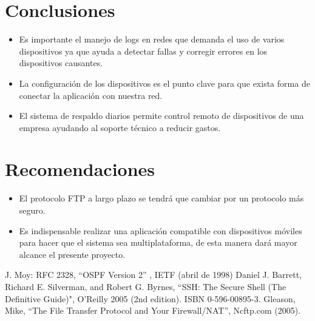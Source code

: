 \documentclass[conference]{IEEEtran}
\begin{document}
\section{Conclusiones}
\begin{itemize}
	\item Es importante el manejo de logs en redes que demanda el uso de varios dispositivos ya que ayuda a detectar fallas y corregir errores en los dispositivos causantes.
	\item La configuración de los dispositivos es el punto clave para que exista forma de conectar la aplicación con nuestra red.
	\item El sistema de respaldo diarios permite control remoto de dispositivos de una empresa ayudando al soporte técnico a reducir gastos.
\end{itemize}
\section{Recomendaciones}
\begin{itemize}
	\item El protocolo FTP a largo plazo se tendrá que cambiar por un protocolo más seguro.
	\item Es indispensable realizar una aplicación compatible con dispositivos móviles para hacer que el sistema sea multiplataforma, de esta manera dará mayor alcance el presente proyecto.
\end{itemize}

\begin{thebibliography}{00}
  J. Moy: RFC 2328, ``OSPF Version 2'' , IETF (abril de 1998)
 Daniel J. Barrett, Richard E. Silverman, and Robert G. Byrnes, ``SSH: The Secure Shell (The Definitive Guide)", O'Reilly 2005 (2nd edition). ISBN 0-596-00895-3.
 Gleason, Mike, ``The File Transfer Protocol and Your Firewall/NAT'',  Ncftp.com (2005).

\end{thebibliography}
\end{document}
